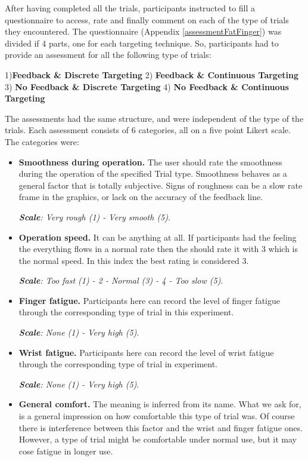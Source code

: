 After having completed all the trials, participants instructed to fill a questionnaire to access, rate and finally comment on each of the type of trials they encountered. The questionnaire (Appendix \ref{assessmentFatFinger}) was divided if 4 parts, one for each targeting technique. So, participants had to provide an assessment for all the following type of trials:

 1)\textbf{Feedback \& Discrete Targeting} 2) \textbf{Feedback \& Continuous Targeting} 3) \textbf{No Feedback \& Discrete Targeting} 4) \textbf{No Feedback \& Continuous Targeting}


The assessments had the same structure, and were independent of the type of the trials. Each assessment consists of 6 categories, all on a five point Likert scale. The categories were:


\begin{itemize}
\item \textbf{Smoothness during operation.} The user should rate the smoothness during the operation of the specified Trial type. Smoothness behaves as a general factor that is totally subjective. Signs of roughness can be a slow rate frame in the graphics, or lack on the accuracy of the feedback line. 

\emph{\textbf{Scale}: Very rough (1) - Very smooth (5)}.


\item \textbf{Operation speed.} It can be anything at all. If participants had the feeling the everything flows in a normal rate then the should rate it with 3 which is the normal speed. In this index the best rating is considered 3.

\emph{\textbf{Scale}: Too fast (1) - 2 - Normal (3) - 4 - Too slow (5)}.

\item \textbf{Finger fatigue.} Participants here can record the level of finger fatigue through the corresponding type of trial in this experiment.

\emph{\textbf{Scale}: None (1) - Very high (5)}.

\item \textbf{Wrist fatigue.} Participants here can record the level of wrist fatigue through the corresponding type of trial in experiment.

\emph{\textbf{Scale}: None (1) - Very high (5)}.

\item \textbf{General comfort.} The meaning is inferred from its name. What we ask for, is a general impression on how comfortable this type of trial was. Of course there is interference between this factor and the wrist and finger fatigue ones. However, a type of trial might be comfortable under normal use, but it may cose fatigue in longer use.


\end{itemize}
